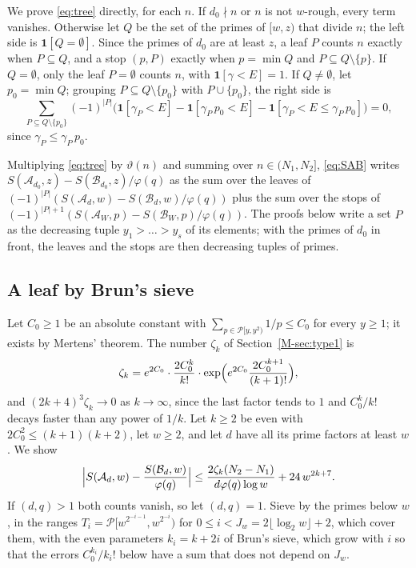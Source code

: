 \documentclass[11pt]{article}
\numberwithin{equation}{section}
\begin{document}
We prove \eqref{eq:tree} directly, for each $n$. If $d_0 \nmid n$ or $n$ is not
$w$-rough, every term vanishes. Otherwise let $Q$ be the set of the primes of $[w, z)$ that divide $n$; the left side is
$\mathbf 1[Q = \emptyset]$. Since the primes of $d_0$ are at least $z$, a leaf $P$ counts $n$ exactly when $P \subseteq
Q$, and a stop $(p, P)$ exactly when $p = \min Q$ and $P \subseteq Q \setminus \{p\}$. If $Q = \emptyset$, only the leaf
$P = \emptyset$ counts $n$, with $\mathbf 1[\gamma < E] = 1$. If $Q \ne \emptyset$, let $p_0 = \min Q$; grouping $P
\subseteq Q \setminus \{p_0\}$ with $P \cup \{p_0\}$, the right side is
\[
  \sum_{P \subseteq Q \setminus \{p_0\}} (-1)^{|P|} \bigl(\mathbf 1[\gamma_P < E] - \mathbf 1[\gamma_P \, p_0 < E]
  - \mathbf 1[\gamma_P < E \le \gamma_P \, p_0]\bigr) = 0,
\]
since $\gamma_P \le \gamma_P \, p_0$.

Multiplying \eqref{eq:tree} by $\vartheta(n)$ and summing over $n \in (N_1, N_2]$,
\eqref{eq:SAB} writes $S(\mathcal A_{d_0}, z) - S(\mathcal B_{d_0}, z)/\varphi(q)$ as the sum over the leaves of
$(-1)^{|P|}(S(\mathcal A_d, w) - S(\mathcal B_d, w)/\varphi(q))$ plus the sum over the stops of $(-1)^{|P| +
1}(S(\mathcal A_W, p) - S(\mathcal B_W, p)/\varphi(q))$. The proofs below write a set $P$ as the decreasing tuple $y_1 >
\dots > y_s$ of its elements; with the primes of $d_0$ in front, the leaves and the stops are then decreasing tuples
of primes.

\subsection*{A leaf by Brun's sieve}

Let $C_0 \ge 1$ be an absolute constant with $\sum_{p \in \mathcal P[y, y^2)} 1/p \le C_0$ for every $y \ge 1$; it
exists by Mertens' theorem. The number $\zeta_k$ of
Section~\ref{M-sec:type1} is
\[
  \zeta_k = e^{2C_0} \cdot \frac{2 C_0^k}{k!} \cdot \exp\Bigl(e^{2C_0} \frac{2 C_0^{k + 1}}{(k + 1)!}\Bigr),
\]
and $(2k + 4)^3 \zeta_k \to 0$ as $k \to \infty$, since the last factor tends to $1$ and $C_0^k/k!$ decays faster than
any power of $1/k$. Let $k \ge 2$ be even with $2C_0^2 \le (k + 1)(k + 2)$, let $w \ge 2$, and let $d$ have all its
prime factors at least $w$. We show
\begin{equation}\label{eq:leaf}
  \Bigl|S(\mathcal A_d, w) - \frac{S(\mathcal B_d, w)}{\varphi(q)}\Bigr|
  \le \frac{2 \zeta_k (N_2 - N_1)}{d \varphi(q) \log w} + 24 \, w^{2k + 7}.
\end{equation}
If $(d, q) > 1$ both counts vanish, so let $(d, q) = 1$. Sieve by the primes below $w$, in the ranges $T_i = \mathcal
P[w^{2^{-i - 1}}, w^{2^{-i}})$ for $0 \le i < J_w = 2 \lfloor \log_2 w \rfloor + 2$, which cover them, with the even
parameters $k_i = k + 2i$ of Brun's sieve, which grow with $i$ so that the errors $C_0^{k_i}/k_i!$ below have a sum
that does not depend on $J_w$.
\end{document}
